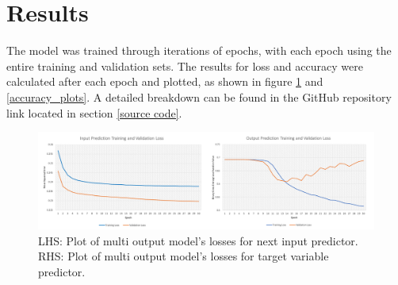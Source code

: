 \documentclass[10pt,onecolumn,letterpaper]{article}
\begin{document}
\newpage

\section{Results} \label{results}

The model was trained through iterations of epochs, with each epoch using the entire training and validation sets. The results for loss and accuracy were calculated after each epoch and plotted, as shown in figure \ref{loss_plots} and \ref{accuracy_plots}. A detailed breakdown can be found in the GitHub repository link located in section \ref{source code}.

\begin{figure}[!hbt!]
\centering
\includegraphics[width=\columnwidth]{loss_plots.png}
\caption{LHS: Plot of multi output model's losses for next input predictor. RHS: Plot of multi output model's losses for target variable predictor.}
\label{loss_plots}
\end{figure}
\end{document}
